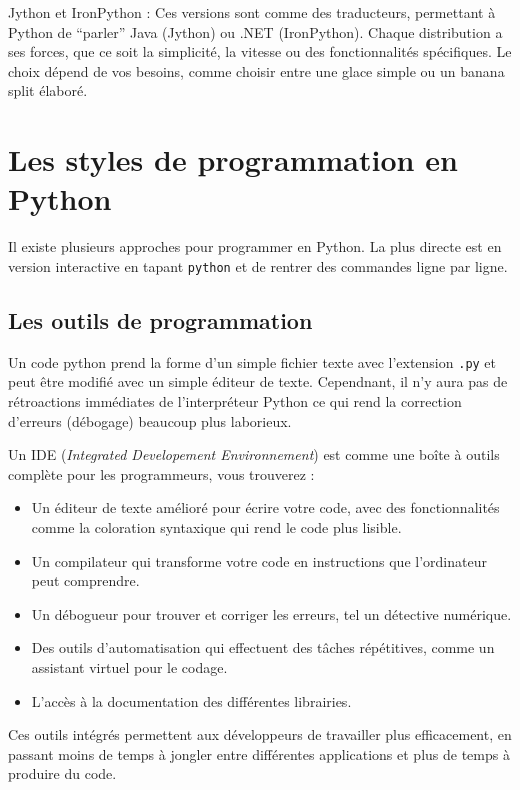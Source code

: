 \documentclass[
  letterpaper,
  DIV=11,
  numbers=noendperiod]{scrreprt}
\begin{document}
Jython et IronPython : Ces versions sont comme des traducteurs,
permettant à Python de ``parler'' Java (Jython) ou .NET (IronPython).
Chaque distribution a ses forces, que ce soit la simplicité, la vitesse
ou des fonctionnalités spécifiques. Le choix dépend de vos besoins,
comme choisir entre une glace simple ou un banana split élaboré.

\section{Les styles de programmation en
Python}\label{les-styles-de-programmation-en-python}

Il existe plusieurs approches pour programmer en Python. La plus directe
est en version interactive en tapant \texttt{python} et de rentrer des
commandes ligne par ligne.

\subsection{Les outils de
programmation}\label{les-outils-de-programmation}

Un code python prend la forme d'un simple fichier texte avec l'extension
\texttt{.py} et peut être modifié avec un simple éditeur de texte.
Cependnant, il n'y aura pas de rétroactions immédiates de l'interpréteur
Python ce qui rend la correction d'erreurs (débogage) beaucoup plus
laborieux.

Un IDE (\emph{Integrated Developement Environnement}) est comme une
boîte à outils complète pour les programmeurs, vous trouverez :

\begin{itemize}
\item
  Un éditeur de texte amélioré pour écrire votre code, avec des
  fonctionnalités comme la coloration syntaxique qui rend le code plus
  lisible.
\item
  Un compilateur qui transforme votre code en instructions que
  l'ordinateur peut comprendre.
\item
  Un débogueur pour trouver et corriger les erreurs, tel un détective
  numérique.
\item
  Des outils d'automatisation qui effectuent des tâches répétitives,
  comme un assistant virtuel pour le codage.
\item
  L'accès à la documentation des différentes librairies.
\end{itemize}

Ces outils intégrés permettent aux développeurs de travailler plus
efficacement, en passant moins de temps à jongler entre différentes
applications et plus de temps à produire du code.
\end{document}
